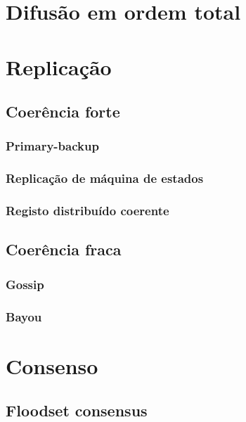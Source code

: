 \documentclass[12pt]{article}
\begin{document}
\newpage

\section{Difusão em ordem total}

\newpage

\section{Replicação}

\subsection{Coerência forte}

\subsubsection{Primary-backup}

\subsubsection{Replicação de máquina de estados}

\subsubsection{Registo distribuído coerente}

\subsection{Coerência fraca}

\subsubsection{Gossip}

\subsubsection{Bayou}

\newpage

\section{Consenso}

\subsection{Floodset consensus}
\end{document}
